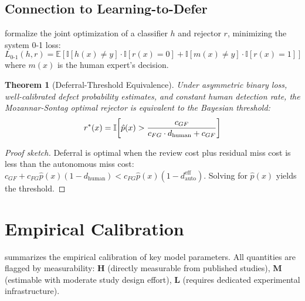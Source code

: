 \documentclass[11pt, a4paper, copyright]{googledeepmind}
\newtheorem{theorem}{Theorem}[section]
\begin{document}
\subsection{Connection to Learning-to-Defer}

\citet{mozannar2020consistent} formalize the joint optimization of a classifier $h$ and rejector $r$, minimizing the system 0-1 loss:
\begin{equation}
L_{0\text{-}1}(h, r) = \mathbb{E}\left[\mathbb{I}[h(x) \neq y] \cdot \mathbb{I}[r(x)=0] + \mathbb{I}[m(x) \neq y] \cdot \mathbb{I}[r(x)=1]\right]
\end{equation}
where $m(x)$ is the human expert's decision.

\begin{theorem}[Deferral-Threshold Equivalence]
\label{thm:deferral-equivalence}
Under asymmetric binary loss, well-calibrated defect probability estimates, and constant human detection rate, the Mozannar-Sontag optimal rejector is equivalent to the Bayesian threshold:
\begin{equation}
r^*(x) = \mathbb{I}\!\left[\hat{p}(x) > \frac{c_{GF}}{c_{FG} \cdot d_{\textup{human}} + c_{GF}}\right]
\end{equation}
\end{theorem}

\begin{proof}[Proof sketch]
Deferral is optimal when the review cost plus residual miss cost is less than the autonomous miss cost: $c_{GF} + c_{FG}\hat{p}(x)(1-d_{\text{human}}) < c_{FG}\hat{p}(x)(1-d_{\text{auto}}^{\text{eff}})$. Solving for $\hat{p}(x)$ yields the threshold.
\end{proof}

\section{Empirical Calibration}
\label{sec:empirical}

 summarizes the empirical calibration of key model parameters. All quantities are flagged by measurability: \textbf{H} (directly measurable from published studies), \textbf{M} (estimable with moderate study design effort), \textbf{L} (requires dedicated experimental infrastructure).
\end{document}
